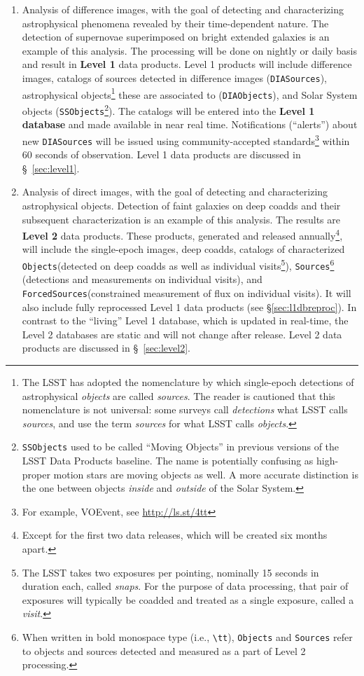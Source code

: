 \documentclass[12pt]{article}
\newcommand{\code}[1]{\texttt{#1}}
\newcommand{\DIASources}{\code{DIASources}\xspace}
\newcommand{\DIAObjects}{\code{DIAObjects}\xspace}
\newcommand{\DB}{{Level 1 database}\xspace}
\newcommand{\DR}{{Level 2 database}\xspace}
\newcommand{\Objects}{\code{Objects}\xspace}
\newcommand{\Sources}{\code{Sources}\xspace}
\newcommand{\ForcedSources}{\code{ForcedSources}\xspace}
\newcommand{\SSObjects}{\code{SSObjects}\xspace}
\begin{document}
\begin{enumerate}
\item Analysis of difference images, with the goal of detecting and characterizing astrophysical phenomena revealed by their time-dependent nature. The detection of supernovae superimposed on bright extended galaxies is an example of this analysis. The processing will be done on nightly or daily basis and result in {\bf Level 1} data products. Level 1 products will include difference images, catalogs of sources detected in difference images (\DIASources), astrophysical objects\footnote{The LSST has adopted the nomenclature by which single-epoch detections of astrophysical {\em objects} are called {\em sources}. The reader is cautioned that this nomenclature is not universal: some surveys call {\em detections} what LSST calls {\em sources}, and use the term {\em sources} for what LSST calls {\em objects}.} these are associated to (\DIAObjects), and Solar System objects (\SSObjects\footnote{\SSObjects used to be called ``Moving Objects'' in previous versions of the LSST Data Products baseline. The name is potentially confusing as high-proper motion stars are moving objects as well. A more accurate distinction is the one between objects {\em inside} and {\em outside} of the Solar System.}). The catalogs will be entered into the {\bf \DB} and made available in near real time. Notifications (``alerts'') about new \DIASources will be issued using community-accepted
standards\footnote{For example, VOEvent, see \url{http://ls.st/4tt}} within 60 seconds of observation. Level 1 data products are discussed in \S~\ref{sec:level1}.

\item Analysis of direct images, with the goal of detecting and characterizing astrophysical objects. Detection of faint galaxies on deep coadds and their subsequent characterization is an example of this analysis. The results are {\bf Level 2} data products. These products, generated and released annually\footnote{Except for the first two data releases, which will be created six months apart.}, will include the single-epoch images, deep coadds, catalogs of characterized \Objects (detected on deep coadds as well as individual visits\footnote{The LSST takes two exposures per pointing, nominally 15 seconds in duration each, called {\em snaps}. For the purpose of data processing, that pair of exposures will typically be coadded and treated as a single exposure, called a {\em visit}.}), \Sources\footnote{When written in bold monospace type (i.e., {\tt \textbackslash{}tt}), \Objects and \Sources refer to objects and sources detected and measured as a part of Level 2 processing.} (detections and measurements on individual visits), and \ForcedSources (constrained measurement of flux on individual visits). It will also include fully reprocessed Level 1 data products (see \S \ref{sec:l1dbreproc}). In contrast to the ``living'' \DB, which is updated in real-time, the \DR{}s are static and will not change after release. Level 2 data products are discussed in \S~\ref{sec:level2}.
\end{enumerate}
\end{document}
